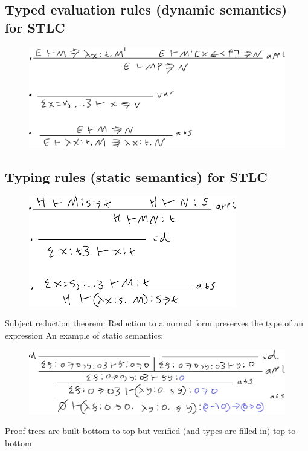 \documentclass[20pt,a4paper,landscape]{extarticle}
\begin{document}
\begin{flushleft}
\subsection{Typed evaluation rules (dynamic semantics) for STLC}
\FloatBarrier
\begin{figure}[h]
\begin{center}
\includegraphics[width=\textwidth]{meta/cs349/STLC_Rules_Eval.pdf}{}
\end{center}
\end{figure}
\FloatBarrier
\clearpage
\subsection{Typing rules (static semantics) for STLC}
\FloatBarrier
\begin{figure}[h]
\begin{center}
\includegraphics[width=0.81\textwidth]{meta/cs349/STLC_Rules_Typing.pdf}{}
\end{center}
\end{figure}
\FloatBarrier
Subject reduction theorem: Reduction to a normal form preserves the type of an expression
\clearpage
An example of static semantics:
\begin{figure}[h]
\begin{center}
\includegraphics[width=\textwidth]{meta/cs349/STLC_Rules_Example.pdf}{}
\end{center}
\end{figure}
\FloatBarrier
Proof trees are built bottom to top but verified (and types are filled in) top-to-bottom
\clearpage

\end{flushleft}
\end{document}
